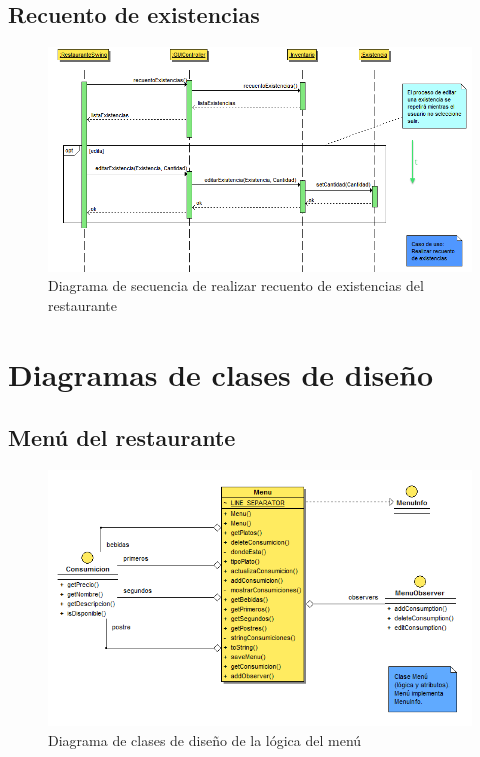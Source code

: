 \documentclass[spanish,a4paper,11pt, twoside]{report}	%
\begin{document}
		\subsection{Recuento de existencias}
		\begin{figure}[!h]
		\centering
		\includegraphics[scale=0.5]{DSexistencias.png}
		\caption{Diagrama de secuencia de realizar recuento de existencias del restaurante}
		\end{figure}



	\section{Diagramas de clases de diseño}
		\subsection{Menú del restaurante}
		\begin{figure}[!h]
		\centering
		\includegraphics[scale=0.5]{DCDmenu.png}
		\caption{Diagrama de clases de diseño de la lógica del menú}
		\end{figure}
\end{document}
